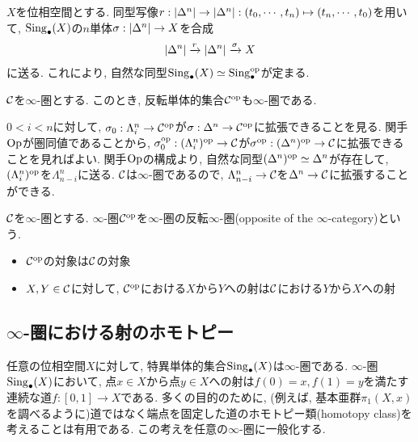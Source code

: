 \documentclass[uplatex, a4paper, 14Q, dvipdfmx]{jsreport}
\begin{document}
\begin{example}
  $X$を位相空間とする. 
  同型写像$r: |\Delta^n| \to |\Delta^n|: (t_0,\cdots,t_n) \mapsto (t_n,\cdots,t_0)$を用いて, 
  $\mathrm{Sing}_\bullet(X)$の$n$単体$\sigma: |\Delta^n| \to X$を合成
  \begin{align*}
    |\Delta^n| \xrightarrow{r} |\Delta^n| \xrightarrow{\sigma} X
  \end{align*}
  に送る. 
  これにより, 自然な同型$\mathrm{Sing}_\bullet(X) \simeq \mathrm{Sing}^{\mathrm{op}}_{\bullet}$が定まる. 
\end{example}

\begin{prop}
  $\mathcal{C}$を$\infty$-圏とする. 
  このとき, 反転単体的集合$\mathcal{C}^{\mathrm{op}}$も$\infty$-圏である. 
\end{prop}

\begin{Proof}
  $0<i<n$に対して, $\sigma_0: \Lambda^n_i \to \mathcal{C}^{\mathrm{op}}$が$\sigma: \Delta^n \to \mathcal{C}^{\mathrm{op}}$に拡張できることを見る. 
  関手$\mathrm{Op}$が圏同値であることから, $\sigma_0^{\mathrm{op}}: (\Lambda^n_i)^{\mathrm{op}} \to \mathcal{C}$が$\sigma^{\mathrm{op}}: (\Delta^n)^{\mathrm{op}} \to \mathcal{C}$に拡張できることを見ればよい. 
  関手$\mathrm{Op}$の構成より, 自然な同型$(\Delta^n)^{\mathrm{op}} \simeq \Delta^n$が存在して, $(\Lambda^n_i)^{\mathrm{op}}$を$\Lambda^n_{n-i}$に送る. 
  $\mathcal{C}$は$\infty$-圏であるので, $\Lambda^n_{n-i} \to \mathcal{C}$を$\Delta^n \to \mathcal{C}$に拡張することができる. 
\end{Proof}

\begin{remark}
  $\mathcal{C}$を$\infty$-圏とする. 
  $\infty$-圏$\mathcal{C}^{\mathrm{op}}$を$\infty$-圏の反転$\infty$-圏(opposite of the $\infty$-category)という. 
  \begin{itemize}
    \item $\mathcal{C}^{\mathrm{op}}$の対象は$\mathcal{C}$の対象
    \item $X,Y \in \mathcal{C}$に対して, $\mathcal{C}^{\mathrm{op}}$における$X$から$Y$への射は$\mathcal{C}$における$Y$から$X$への射 
  \end{itemize}
\end{remark}

\subsection{\texorpdfstring{$\infty$}{infty}-圏における射のホモトピー}

任意の位相空間$X$に対して, 特異単体的集合$\mathrm{Sing}_\bullet(X)$は$\infty$-圏である. 
$\infty$-圏$\mathrm{Sing}_\bullet(X)$において, 点$x \in X$から点$y \in X$への射は$f(0)=x,f(1)=y$を満たす連続な道$f: [0,1] \to X$である. 
多くの目的のために, (例えば, 基本亜群$\pi_1(X,x)$を調べるように)道ではなく端点を固定した道のホモトピー類(homotopy class)を考えることは有用である. 
この考えを任意の$\infty$-圏に一般化する. 
\end{document}
